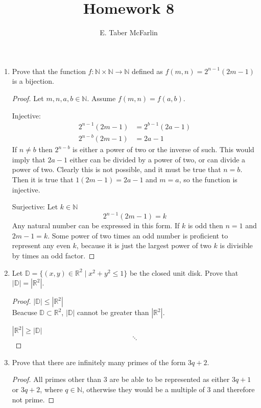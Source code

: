 \documentclass[12pt,a4paper,reqno,parskip=full]{amsart}
\numberwithin{equation}{section}
\theoremstyle{plain}
\theoremstyle{definition}
\renewcommand{\leq}{\leqslant}
\renewcommand{\geq}{\geqslant}
\begin{document}
\title{Homework 8}

\author{E. Taber McFarlin}

\maketitle

\begin{enumerate}
  \item Prove that the function $f:\mathbb{N} \times\mathbb{N} \to\mathbb{N}$ defined as
        $f(m,n)=2^{n-1}(2m-1)$ is a bijection.

        \begin{proof} Let $m,n,a,b\in\mathbb{N}$. Assume $f(m,n) = f(a,b)$.

          Injective:
          \begin{align*}
            2^{n - 1}(2m - 1) & = 2^{b - 1}(2a - 1) \\
            2^{n - b}(2m - 1) & = 2a - 1
          \end{align*}
          If $n \neq b$ then $2^{n - b}$ is either a power of two or the inverse of such. This would
          imply that $2a - 1$ either can be divided by a power of two, or can divide a power of two.
          Clearly this is not possible, and it must be true that $n = b$. Then it is true that
          $1(2m - 1) = 2a - 1$ and $m = a$, so the function is injective.

          Surjective: Let $k\in\mathbb{N}$
          \[2^{n - 1}(2m - 1) = k\]
          Any natural number can be expressed in this form. If $k$ is odd then $n = 1$ and
          $2m - 1 = k$. Some power of two times an odd number is proficient to represent any even
          $k$, because it is just the largest power of two $k$ is divisible by times an odd factor.
        \end{proof}
  \item Let $\mathbb{D}=\{(x,y)\in\mathbb{R}^2\mid x^2+y^2\leq1\}$ be the closed unit disk. Prove
        that $|\mathbb{D}| = |\mathbb{R}^2|$.
        \begin{proof}
          $|\mathbb{D}| \leq |\mathbb{R}^2|$ \\
          Beacuse $\mathbb{D} \subset \mathbb{R}^2$, $|\mathbb{D}|$ cannot be greater than
          $|\mathbb{R}^2|$.

          $ |\mathbb{R}^2| \geq |\mathbb{D}|$
          \[\ddots\]
        \end{proof}
  \item Prove that there are infinitely many primes of the form $3q + 2$.
        \begin{proof}
          All primes other than 3 are be able to be represented as either $3q + 1$ or $3q + 2$,
          where $q\in\mathbb{N}$, otherwise they would be a multiple of 3 and therefore not prime.


\end{proof}
\end{enumerate}
\end{document}
